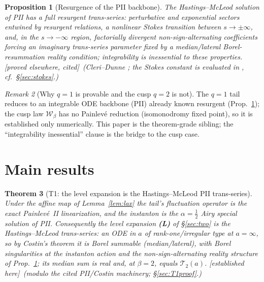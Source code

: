\documentclass[11pt,reqno]{amsart}
\theoremstyle{plain}
\newtheorem{theorem}{Theorem}
\newtheorem{proposition}[theorem]{Proposition}
\theoremstyle{definition}
\theoremstyle{remark}
\newtheorem{remark}[theorem]{Remark}
\newcommand{\tagPr}{{\footnotesize\textsf{[established here]}}}
\newcommand{\tagP}{{\footnotesize\textsf{[proved elsewhere, cited]}}}
\begin{document}
\begin{proposition}[Resurgence of the PII backbone]\label{prop:hm}
The Hastings--McLeod solution of PII has a full resurgent trans-series: perturbative and exponential
sectors entwined by resurgent relations, a nonlinear Stokes transition between $s\to\pm\infty$, and,
in the $s\to-\infty$ region, factorially divergent \emph{non-sign-alternating} coefficients forcing
an imaginary trans-series parameter fixed by a median/lateral Borel-resummation reality condition;
integrability is inessential to these properties. \tagP\ \emph{(Cleri--Dunne \cite{CleriDunne}; the
Stokes constant is evaluated in \cite{Dunne2025}, cf.\ \S\ref{sec:stokes}.)}
\end{proposition}

\begin{remark}[Why $q{=}1$ is provable and the cusp $q{=}2$ is not]\label{rem:crutch}
The $q{=}1$ tail reduces to an integrable ODE backbone (PII) already known resurgent
(Prop.~\ref{prop:hm}); the cusp law $\mathcal W_\beta$ has no Painlev\'e reduction (isomonodromy
fixed point), so it is established only numerically. This paper is the theorem-grade sibling; the
``integrability inessential'' clause is the bridge to the cusp case.
\end{remark}

\section{Main results}\label{sec:results}

\begin{theorem}[T1: the level expansion is the Hastings--McLeod PII trans-series]\label{thm:T1}
Under the affine map of Lemma~\ref{lem:lax} the tail's fluctuation operator is the exact Painlev\'e~II
linearization, and the instanton is the $\alpha=\tfrac12$ Airy special solution of PII. Consequently
the level expansion \textbf{(L)} of \S\ref{sec:two} is the Hastings--McLeod trans-series: an ODE in
$a$ of rank-one/irregular type at $a=\infty$, so by Costin's theorem \cite{Costin} it is Borel
summable (median/lateral), with Borel singularities at the instanton action and the
non-sign-alternating reality structure of Prop.~\ref{prop:hm}; its median sum is real and, at
$\beta=2$, equals $\mathcal T_2(a)$. \tagPr\ \emph{(modulo the cited PII/Costin machinery; \S\ref{sec:T1proof}.)}
\end{theorem}
\end{document}
